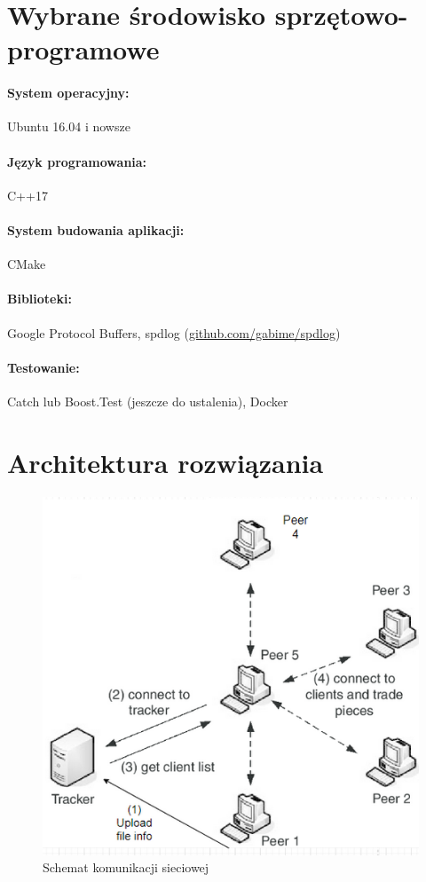 \documentclass[11pt]{article}
\begin{document}
\section{Wybrane środowisko sprzętowo-programowe}
\paragraph{System operacyjny:}
Ubuntu 16.04 i nowsze
\paragraph{Język programowania:}
 C++17
\paragraph{System budowania aplikacji:}
CMake
\paragraph{Biblioteki:}
Google Protocol Buffers, spdlog (\url{github.com/gabime/spdlog})
\paragraph{Testowanie:}
Catch lub Boost.Test (jeszcze do ustalenia), Docker
\section{Architektura rozwiązania}
\begin{figure}[h]
\caption{Schemat komunikacji sieciowej}
\centering
\includegraphics[scale=0.8]{0}
\end{figure}
\clearpage
\end{document}
